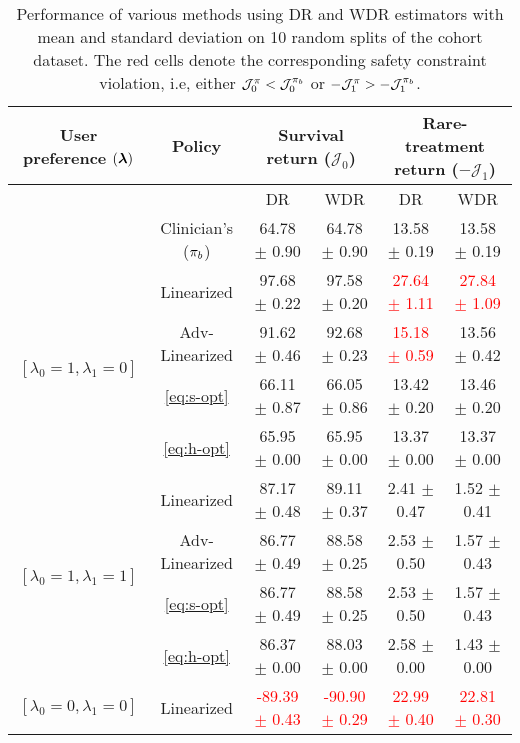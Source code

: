 \begin{table*}[ht!]
\centering
\caption{Performance of various methods using DR and WDR estimators with mean and standard deviation on 10 random splits of the cohort dataset. The red cells denote the corresponding safety constraint violation, i.e, either $\mathcal{J}_{0}^{\pi} < \mathcal{J}_{0}^{\pi_{b}}$ or $-\mathcal{J}_{1}^{\pi} > -\mathcal{J}_{1}^{\pi_{b}}$.}
\label{table:sepsis-best-results}
\begin{adjustbox}{max width=1\textwidth,center}
\begin{tabular}{cccccc}
\toprule
\multicolumn{1}{c}{User preference $(\bm{\lambda})$} & \multicolumn{1}{c}{Policy} & \multicolumn{2}{c}{Survival return ($\mathcal{J}_0$)} & \multicolumn{2}{c}{Rare-treatment return ($- \mathcal{J}_1$)} \\
\hline
& & DR & WDR & DR & WDR  \\  \cline{3-6}
& Clinician's ($\pi_{b}$) & 64.78 $\pm$ 0.90 & 64.78 $\pm$ 0.90          & 13.58 $\pm$ 0.19 & 13.58 $\pm$ 0.19  \\
\midrule %
\multirow{4}{*}{$[\lambda_0=1, \lambda_1 = 0]$} 
& Linearized & 97.68 $\pm$ 0.22 & 97.58 $\pm$ 0.20   & \textcolor{red}{27.64 $\pm$ 1.11 }& \textcolor{red}{27.84 $\pm$ 1.09 } \\ 
& Adv-Linearized  & 91.62 $\pm$ 0.46 & 92.68 $\pm$ 0.23   & \textcolor{red}{15.18 $\pm$ 0.59 }& 13.56 $\pm$ 0.42 \\
& \ref{eq:s-opt}   & 66.11 $\pm$ 0.87 & 66.05 $\pm$ 0.86   & 13.42 $\pm$ 0.20 & 13.46 $\pm$ 0.20   \\
& \ref{eq:h-opt} & 65.95 $\pm$ 0.00 & 65.95 $\pm$ 0.00   & 13.37 $\pm$ 0.00 & 13.37 $\pm$ 0.00  \\
\midrule 
\multirow{4}{*}{$[\lambda_0=1, \lambda_1 = 1]$}
& Linearized & 87.17 $\pm$ 0.48 & 89.11 $\pm$ 0.37   & 2.41 $\pm$ 0.47 & 1.52 $\pm$ 0.41\\
& Adv-Linearized  & 86.77 $\pm$ 0.49 & 88.58 $\pm$ 0.25   & 2.53 $\pm$ 0.50 & 1.57 $\pm$ 0.43  \\
& \ref{eq:s-opt}  & 86.77 $\pm$ 0.49 & 88.58 $\pm$ 0.25   & 2.53 $\pm$ 0.50 & 1.57 $\pm$ 0.43   \\
& \ref{eq:h-opt} & 86.37 $\pm$ 0.00 & 88.03 $\pm$ 0.00   & 2.58 $\pm$ 0.00 & 1.43 $\pm$ 0.00  \\
\midrule 
\multirow{4}{*}{$[\lambda_0=0, \lambda_1 = 0]$}
& Linearized & \textcolor{red}{-89.39 $\pm$ 0.43} & \textcolor{red}{-90.90 $\pm$ 0.29 }  & \textcolor{red}{22.99 $\pm$ 0.40 }& \textcolor{red}{22.81 $\pm$ 0.30 }  \\ 

\end{tabular}
\end{adjustbox}
\end{table*}
